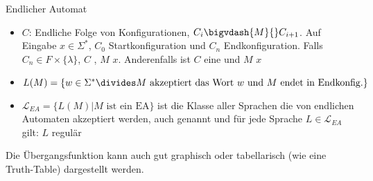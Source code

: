 \begin{definition}[]{Endlicher Automat}
\begin{itemize}
        \item {} $C$: Endliche Folge von Konfigurationen, $C_i \bigvdash{M}{} C_{i + 1}$.
              Auf Eingabe $x \in \Sigma^*$, $C_0$ Startkonfiguration und $C_n$ Endkonfiguration.
              Falls $C_n \in F \times \{ \lambda \}$, $C$ , $M$  $x$.
              Anderenfalls ist $C$ eine  und $M$  $x$
        \item {} $L(M) = \{ w \in \Sigma^* \divides \text{$M$ akzeptiert das Wort } w \text{ und $M$ endet in Endkonfig.} \}$
        \item $\mathcal{L}_{EA} = \{ L(M) | M \text{ ist ein EA}\}$ ist die Klasse aller Sprachen die von endlichen Automaten akzeptiert werden, auch genannt  und für jede Sprache $L \in \mathcal{L}_{EA}$ gilt: $L$ regulär
    \end{itemize}
\end{definition}
Die Übergangsfunktion kann auch gut graphisch oder tabellarisch (wie eine Truth-Table) dargestellt werden.

